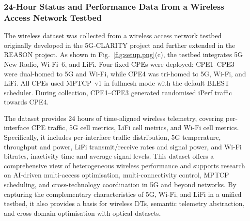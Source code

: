 \documentclass[9pt,twocolumn,twoside]{osajnl}
\begin{document}
\subsubsection{24-Hour Status and Performance Data from a Wireless Access Network Testbed}

The wireless dataset was collected from a wireless access network testbed originally developed in the 5G-CLARITY project and further extended in the REASON project. As shown in Fig.~\ref{fig:setup.png}(c), the testbed integrates 5G New Radio, Wi-Fi~6, and LiFi. Four fixed CPEs were deployed: CPE1--CPE3 were dual-homed to 5G and Wi-Fi, while CPE4 was tri-homed to 5G, Wi-Fi, and LiFi. All CPEs used MPTCP~v1 in fullmesh mode with the default BLEST scheduler. During collection, CPE1--CPE3 generated randomised iPerf traffic towards CPE4.

The dataset provides 24 hours of time-aligned wireless telemetry, covering per-interface CPE traffic, 5G cell metrics, LiFi cell metrics, and Wi-Fi cell metrics. Specifically, it includes per-interface traffic distribution, 5G temperature, throughput and power, LiFi transmit/receive rates and signal power, and Wi-Fi bitrates, inactivity time and average signal levels. This dataset offers a comprehensive view of heterogeneous wireless performance and supports research on AI-driven multi-access optimisation, multi-connectivity control, MPTCP scheduling, and cross-technology coordination in 5G and beyond networks. By capturing the complementary characteristics of 5G, Wi-Fi, and LiFi in a unified testbed, it also provides a basis for wireless DTs, semantic telemetry abstraction, and cross-domain optimisation with optical datasets.




\end{document}
